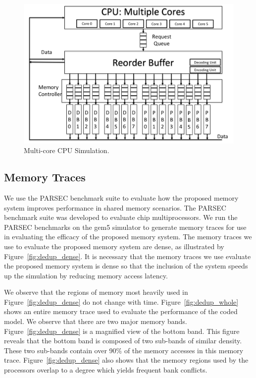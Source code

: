 \begin{figure}[h!] \centering
\includegraphics[width=0.9\linewidth]{figures/multi-core-cpu.png} 
\caption{Multi-core CPU Simulation.}
\label{fig:multi-core-cpu}
\end{figure}

\subsection{Memory Traces}
We use the PARSEC benchmark suite to evaluate how the proposed memory system improves performance in shared memory scenarios. The PARSEC benchmark suite was developed to evaluate chip multiprocessors. We run the PARSEC benchmarks on the gem5 simulator to generate memory traces for use in evaluating the efficacy of the proposed memory system. The memory traces we use to evaluate the proposed memory system are dense, as illustrated by Figure~\ref{fig:dedup_dense}. It is necessary that the memory traces we use evaluate the proposed memory system is dense so that the inclusion of the system speeds up the simulation by reducing memory access latency.
 
We observe that the regions of memory most heavily used in Figure~\ref{fig:dedup_dense} do not change with time. Figure~\ref{fig:dedup_whole} shows an entire memory trace used to evaluate the performance of the coded model. We observe that there are two major memory bands. Figure~\ref{fig:dedup_dense} is a magnified view of the bottom band. This figure reveals that the bottom band is composed of two sub-bands of similar density. These two sub-bands contain over 90\% of the memory accesses in this memory trace. Figure~\ref{fig:dedup_dense} also shows that the memory regions used by the processors overlap to a degree which yields frequent bank conflicts.

